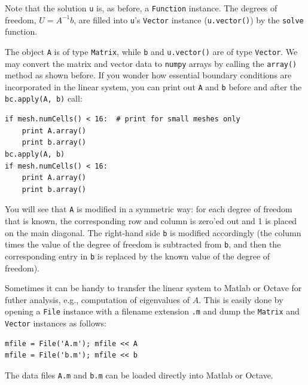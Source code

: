 Note that the solution {\fontsize{12pt}{12pt}\verb!u!} is, as before, a {\fontsize{12pt}{12pt}\verb!Function!} instance.
The degrees of freedom, $U=A^{-1}b$, are filled
into {\fontsize{12pt}{12pt}\texttt{u}}'s {\fontsize{12pt}{12pt}\texttt{Vector}} instance ({\fontsize{12pt}{12pt}\texttt{u.vector()}})
by the {\fontsize{12pt}{12pt}\verb!solve!} function.

The object {\fontsize{12pt}{12pt}\verb!A!} is of type {\fontsize{12pt}{12pt}\verb!Matrix!}, while {\fontsize{12pt}{12pt}\verb!b!} and
{\fontsize{12pt}{12pt}\verb!u.vector()!} are of type {\fontsize{12pt}{12pt}\verb!Vector!}. We may convert the
matrix and vector data to {\fontsize{12pt}{12pt}\verb!numpy!} arrays by calling the
{\fontsize{12pt}{12pt}\verb!array()!} method as shown before. If you wonder how essential
boundary conditions are incorporated in the linear system, you can
print out {\fontsize{12pt}{12pt}\texttt{A}} and {\fontsize{12pt}{12pt}\texttt{b}} before and after the
{\fontsize{12pt}{12pt}\texttt{bc.apply(A, b)}} call:
\begin{Verbatim}[fontsize=\fontsize{10pt}{10pt},tabsize=8,baselinestretch=1.05,
fontfamily=tt,xleftmargin=7mm]
if mesh.numCells() < 16:  # print for small meshes only
    print A.array()
    print b.array()
bc.apply(A, b)
if mesh.numCells() < 16:
    print A.array()
    print b.array()
\end{Verbatim}
\noindent
You will see that {\fontsize{12pt}{12pt}\texttt{A}} is modified in a symmetric way:
for each degree of freedom that is known, the corresponding row
and column is zero'ed out and 1 is placed on the main diagonal.
The right-hand side {\fontsize{12pt}{12pt}\texttt{b}} is modified accordingly (the column times
the value of the degree of freedom is subtracted from {\fontsize{12pt}{12pt}\texttt{b}}, and
then the corresponding entry in {\fontsize{12pt}{12pt}\texttt{b}} is replaced by the known value
of the degree of freedom).

Sometimes it can be handy to transfer the linear system to Matlab or Octave
for futher analysis, e.g., computation of eigenvalues of $A$.
This is easily done by opening
a {\fontsize{12pt}{12pt}\texttt{File}} instance with a filename extension {\fontsize{12pt}{12pt}\texttt{.m}} and dump
the {\fontsize{12pt}{12pt}\texttt{Matrix}} and {\fontsize{12pt}{12pt}\texttt{Vector}} instances as follows:
\begin{Verbatim}[fontsize=\fontsize{10pt}{10pt},tabsize=8,baselinestretch=1.05,
fontfamily=tt,xleftmargin=7mm]
mfile = File('A.m'); mfile << A
mfile = File('b.m'); mfile << b
\end{Verbatim}
\noindent
The data files {\fontsize{12pt}{12pt}\texttt{A.m}} and {\fontsize{12pt}{12pt}\texttt{b.m}} can be loaded directly into
Matlab or Octave.

